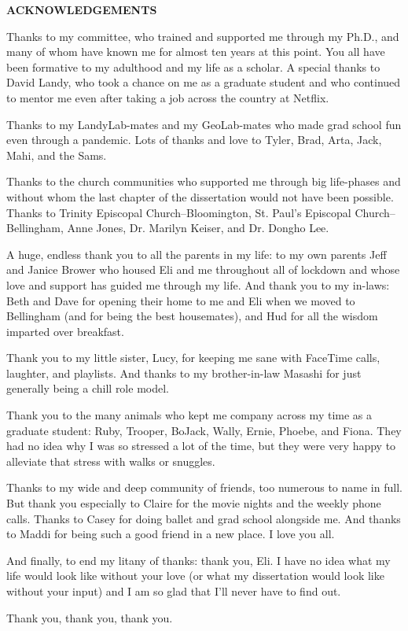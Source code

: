 \begin{centering}
\textbf{ACKNOWLEDGEMENTS}\\
\vspace{\baselineskip}
\end{centering}

Thanks to my committee, who trained and supported me through my Ph.D., and many of whom have known me for almost ten years at this point. You all have been formative to my adulthood and my life as a scholar. A special thanks to David Landy, who took a chance on me as a graduate student and who continued to mentor me even after taking a job across the country at Netflix. 

Thanks to my LandyLab-mates and my GeoLab-mates who made grad school fun even through a pandemic. Lots of thanks and love to Tyler, Brad, Arta, Jack, Mahi, and the Sams. 

Thanks to the church communities who supported me through big life-phases and without whom the last chapter of the dissertation would not have been possible. Thanks to Trinity Episcopal Church--Bloomington, St. Paul's Episcopal Church--Bellingham, Anne Jones, Dr. Marilyn Keiser, and Dr. Dongho Lee. 

A huge, endless thank you to all the parents in my life: to my own parents Jeff and Janice Brower who housed Eli and me throughout all of lockdown and whose love and support has guided me through my life. And thank you to my in-laws: Beth and Dave for opening their home to me and Eli when we moved to Bellingham (and for being the best housemates), and Hud for all the wisdom imparted over breakfast. 

Thank you to my little sister, Lucy, for keeping me sane with FaceTime calls, laughter, and playlists. And thanks to my brother-in-law Masashi for just generally being a chill role model. 

Thank you to the many animals who kept me company across my time as a graduate student: Ruby, Trooper, BoJack, Wally, Ernie, Phoebe, and Fiona. They had no idea why I was so stressed a lot of the time, but they were very happy to alleviate that stress with walks or snuggles. 

Thanks to my wide and deep community of friends, too numerous to name in full. But thank you especially to Claire for the movie nights and the weekly phone calls. Thanks to Casey for doing ballet and grad school alongside me. And thanks to Maddi for being such a good friend in a new place. I love you all. 

And finally, to end my litany of thanks: thank you, Eli. I have no idea what my life would look like without your love (or what my dissertation would look like without your input) and I am so glad that I'll never have to find out. 

Thank you, thank you, thank you.

